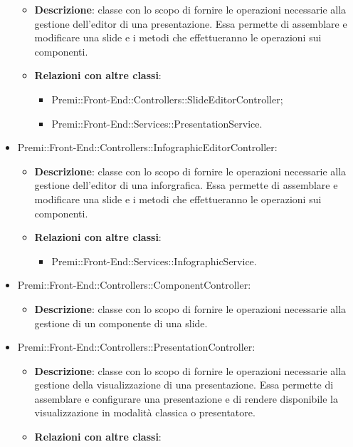 \begin{itemize}
	\begin{itemize}
		\item \textbf{Descrizione}: classe con lo scopo di fornire le operazioni necessarie alla gestione dell'editor di una presentazione. Essa permette di assemblare e modificare una \gls{slide} e i metodi che effettueranno le operazioni sui componenti.
		\item \textbf{Relazioni con altre classi}:
		\begin{itemize}
			\item Premi::Front-End::Controllers::SlideEditorController;
			\item Premi::Front-End::Services::PresentationService.
		\end{itemize}
	\end{itemize}
	\item  Premi::Front-End::Controllers::InfographicEditorController:
	\begin{itemize}
		\item \textbf{Descrizione}: classe con lo scopo di fornire le operazioni necessarie alla gestione dell'editor di una inforgrafica. Essa permette di assemblare e modificare una \gls{slide} e i metodi che effettueranno le operazioni sui componenti.
		\item \textbf{Relazioni con altre classi}:
		\begin{itemize}
			\item Premi::Front-End::Services::InfographicService.
		\end{itemize}
	\end{itemize}
	\item  Premi::Front-End::Controllers::ComponentController:
	\begin{itemize}
		\item \textbf{Descrizione}: classe con lo scopo di fornire le operazioni necessarie alla gestione di un componente di una \gls{slide}.
	\end{itemize}
	\item  Premi::Front-End::Controllers::PresentationController:
	\begin{itemize}
		\item \textbf{Descrizione}: classe con lo scopo di fornire le operazioni necessarie alla gestione della visualizzazione di una presentazione. Essa permette di assemblare e configurare una presentazione e di rendere disponibile la visualizzazione in modalità classica o presentatore.
		\item \textbf{Relazioni con altre classi}:
		\begin{itemize}

\end{itemize}
\end{itemize}
\end{itemize}
